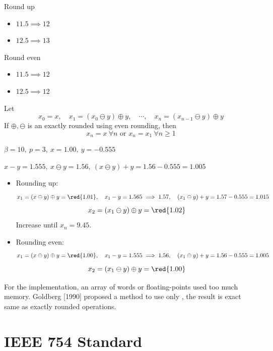 \begin{eg}
    Round up
    \begin{itemize}
        \item $11.5 \implies 12$
        \item $12.5 \implies 13$
    \end{itemize}
    Round even
    \begin{itemize}
        \item $11.5 \implies 12$
        \item $12.5 \implies 12$
    \end{itemize}
\end{eg}

\begin{theorem}
    Let \[
        x_0 = x, \quad x_1 = (x_0 \ominus y) \oplus y, \quad \cdots, \quad x_n = (x_{n-1} \ominus y) \oplus y
    \]
    If $\oplus, \ominus$ is an exactly rounded using even rounding, then \[
        x_n = x\ \forall n \text{ or } x_n = x_1\ \forall n \geq 1
    \]
\end{theorem}

\newpage

\begin{eg}
    $\beta = 10,\ p = 3,\ x = 1.00,\ y = -0.555$
\end{eg}
$x - y = 1.555, \ x \ominus y = 1.56, \ (x \ominus y) + y = 1.56 - 0.555 = 1.005$
\begin{itemize}
    \item Rounding up: \[
        x_1 = (x \ominus y) \oplus y = \red{1.01},\quad x_1 - y = 1.565 \implies 1.57, \quad (x_1 \ominus y) + y = 1.57 - 0.555 = 1.015
    \]
    \[
        x_2 = (x_1 \ominus y) \oplus y = \red{1.02}
    \]
    Increase until $x_n = 9.45$.
    \item Rounding even: \[
        x_1 = (x \ominus y) \oplus y = \red{1.00},\quad x_1 - y = 1.555 \implies 1.56, \quad (x_1 \ominus y) + y = 1.56 - 0.555 = 1.005
    \]
    \[
        x_2 = (x_1 \ominus y) \oplus y = \red{1.00}
    \]
\end{itemize}

\begin{note}
    For the implementation, an array of words or floating-points used too much memory. Goldberg [1990] proposed a method to use only , the result is exact same as exactly rounded operations.
\end{note}

\section{IEEE 754 Standard}

